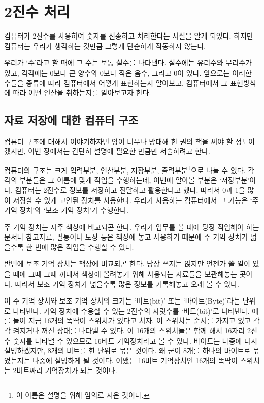 \documentclass{article}
\begin{document}
\section{2진수 처리}

컴퓨터가 2진수를 사용하여 숫자를 전송하고 처리한다는 사실을 알게 되었다.
하지만 컴퓨터는 우리가 생각하는 것만큼 그렇게 단순하게 작동하지 않는다.

우리가 `수'라고 할 때에 그 수는 보통 실수를 나타낸다. 실수에는 유리수와 무리수가 있고,
각각에는 0보다 큰 양수와 0보다 작은 음수, 그리고 0이 있다.
앞으로는 이러한 수들을 종류에 따라 컴퓨터에서
어떻게 표현하는지 알아보고, 컴퓨터에서 그 표현방식에 따라 어떤 연산을 취하는지를 알아보고자
한다.

\subsection{자료 저장에 대한 컴퓨터 구조}

컴퓨터 구조에 대해서 이야기하자면 양이 너무나 방대해 한 권의 책을 써야 할 정도이겠지만,
이번 장에서는 간단히 설명에 필요한 만큼만 서술하려고 한다.

컴퓨터의 구조는 크게 입력부분, 연산부분, 저장부분, 출력부분\footnote{이 이름은
설명을 위해 임의로 지은 것이다.}으로 나눌 수 있다.
각각의 부분들은 그 이름에 맞게 작업을 수행하는데, 이번에 알아볼 부분은 `저장부분'이다.
컴퓨터는 2진수로 정보를 저장하고 전달하고 활용한다고 했다. 따라서 0과 1을 많이 저장할 수 있게
고안된 장치를 사용한다. 우리가 사용하는 컴퓨터에서 그 기능은 `주 기억 장치'와 `보조 기억 장치'가
수행한다.

주 기억 장치는 자주 책상에 비교되곤 한다. 우리가 업무를 볼 때에 당장 작업해야 하는 문서나
참고자료, 필통이나 도장 등은 책상에 놓고 사용하기 때문에 주 기억 장치가 넓을수록 한 번에 많은
작업을 수행할 수 있다.

반면에 보조 기억 장치는 책장에 비교되곤 한다. 당장 쓰지는 않지만 언젠가 쓸 일이 있을 때에
그때 그때 꺼내서 책상에 올려놓기 위해 사용되는 자료들을 보관해놓는 곳이다. 따라서 보조 기억
장치가 넓을수록 많은 정보를 기록해놓고 오래 볼 수 있다.

이 주 기억 장치와 보조 기억 장치의 크기는 `비트(bit)' 또는 `바이트(Byte)'라는 단위로
나타낸다. 기억 장치에 수용할 수 있는 2진수의 자릿수를 `비트(bit)'로 나타낸다. 예를 들어
지금 16개의 똑딱이 스위치가 있다고 치자. 이 스위치는 순서를 가지고 있고 각각 켜지거나
꺼진 상태를 나타낼 수 있다. 이 16개의 스위치들은 함께 해서 16자리 2진수 숫자를 나타낼 수
있으므로 16비트 기억장치라고 볼 수 있다. 바이트는 나중에 다시 설명하겠지만, 8개의 비트를
한 단위로 묶은 것이다. 왜 굳이 8개를 하나의 바이트로 묶었는지는 나중에 설명하게 될 것이다.
어쨌든 16비트 기억장치인 16개의 똑딱이 스위치는 2비트짜리 기억장치가 되는 것이다.
\end{document}
